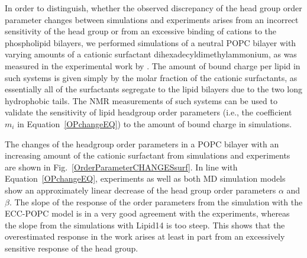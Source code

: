  

In order to distinguish, whether the observed discrepancy of the head group order parameter changes between simulations and experiments 
arises from an incorrect sensitivity of the head group or from an excessive binding of cations to the phospholipid bilayers,
we performed simulations of a neutral POPC bilayer with varying amounts of a cationic surfactant dihexadecyldimethylammonium, 
as was measured in the experimental work by \citet{scherer89}.
The amount of bound charge per lipid
in such systems is given simply by the molar fraction of the cationic surfactants, 
as essentially all of the surfactants segregate to the lipid bilayers 
due to the two long hydrophobic tails.
The NMR measurements of such systems  
can be used to validate the sensitivity of lipid headgroup order parameters 
(i.e., the coefficient $m_i$ in Equation~\ref{OPchangeEQ}) 
to the amount of bound charge in simulations. 

The changes of the headgroup order parameters in a POPC bilayer with an increasing amount of 
the cationic surfactant from simulations and experiments~\citep{scherer89} are shown in Fig.~\ref{OrderParameterCHANGESsurf}.
In line with Equation~\ref{OPchangeEQ},
experiments as well as both MD simulation models show an approximately linear decrease of the head group order parameters $\alpha$ and $\beta$.
The slope of the response of the order parameters %
from the simulation with the ECC-POPC model 
is in a very good agreement with the experiments, 
whereas the slope from the simulations with Lipid14 is too steep. 
This shows that the overestimated response in the work \citep{catte16}
arises at least in part from an excessively sensitive response of the head group. 


